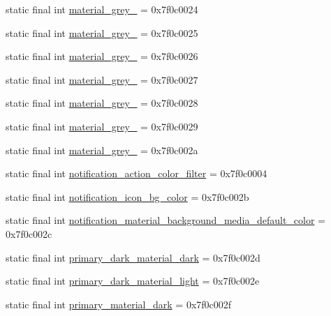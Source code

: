 \begin{CompactItemize}
static final int \hyperlink{classandroid_1_1support_1_1v7_1_1palette_1_1_r_1_1color_b8f5191ef8fb1895d224120ef0d8d485}{material\_\-grey\_} = 0x7f0c0024
\item 
static final int \hyperlink{classandroid_1_1support_1_1v7_1_1palette_1_1_r_1_1color_07ae37a364e58a1a7b0d9c364f7adb84}{material\_\-grey\_} = 0x7f0c0025
\item 
static final int \hyperlink{classandroid_1_1support_1_1v7_1_1palette_1_1_r_1_1color_aa4a3950cb00de9b0ce8e173ea333f88}{material\_\-grey\_} = 0x7f0c0026
\item 
static final int \hyperlink{classandroid_1_1support_1_1v7_1_1palette_1_1_r_1_1color_368dd854c306ccec34376c057bf355d9}{material\_\-grey\_} = 0x7f0c0027
\item 
static final int \hyperlink{classandroid_1_1support_1_1v7_1_1palette_1_1_r_1_1color_08f6b77594f10534251020ecabe79157}{material\_\-grey\_} = 0x7f0c0028
\item 
static final int \hyperlink{classandroid_1_1support_1_1v7_1_1palette_1_1_r_1_1color_b15252e993677a83abb4dd8af2c52ca3}{material\_\-grey\_} = 0x7f0c0029
\item 
static final int \hyperlink{classandroid_1_1support_1_1v7_1_1palette_1_1_r_1_1color_74c0d8f4986b465602a42d3088ae3172}{material\_\-grey\_} = 0x7f0c002a
\item 
static final int \hyperlink{classandroid_1_1support_1_1v7_1_1palette_1_1_r_1_1color_3c3c1e5703a7bdfe5b372c73e3d6f946}{notification\_\-action\_\-color\_\-filter} = 0x7f0c0004
\item 
static final int \hyperlink{classandroid_1_1support_1_1v7_1_1palette_1_1_r_1_1color_674a789066e837cf20f9c9c3c783f7f0}{notification\_\-icon\_\-bg\_\-color} = 0x7f0c002b
\item 
static final int \hyperlink{classandroid_1_1support_1_1v7_1_1palette_1_1_r_1_1color_f894197cb224cb913067d44197f40d63}{notification\_\-material\_\-background\_\-media\_\-default\_\-color} = 0x7f0c002c
\item 
static final int \hyperlink{classandroid_1_1support_1_1v7_1_1palette_1_1_r_1_1color_804272bf18894c535805574126c0738e}{primary\_\-dark\_\-material\_\-dark} = 0x7f0c002d
\item 
static final int \hyperlink{classandroid_1_1support_1_1v7_1_1palette_1_1_r_1_1color_8aa06858c17c15be9ef392be113f8c47}{primary\_\-dark\_\-material\_\-light} = 0x7f0c002e
\item 
static final int \hyperlink{classandroid_1_1support_1_1v7_1_1palette_1_1_r_1_1color_7f95e7de94748a99438b2344587d7f3b}{primary\_\-material\_\-dark} = 0x7f0c002f

\end{CompactItemize}
